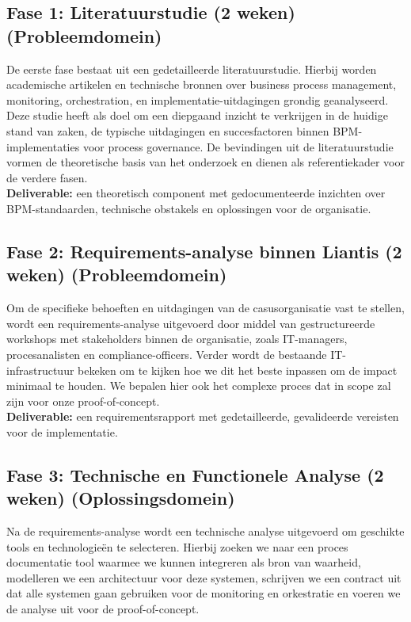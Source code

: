 \subsection{Fase 1: Literatuurstudie (2 weken) (Probleemdomein)}

De eerste fase bestaat uit een gedetailleerde literatuurstudie. Hierbij worden academische artikelen en technische bronnen over business process management, monitoring, orchestration, en implementatie-uitdagingen grondig geanalyseerd. Deze studie heeft als doel om een diepgaand inzicht te verkrijgen in de huidige stand van zaken, de typische uitdagingen en succesfactoren binnen BPM-implementaties voor process governance. De bevindingen uit de literatuurstudie vormen de theoretische basis van het onderzoek en dienen als referentiekader voor de verdere fasen. \\

\textbf{Deliverable:} een theoretisch component met gedocumenteerde inzichten over BPM-standaarden, technische obstakels en oplossingen voor de organisatie.

\subsection{Fase 2: Requirements-analyse binnen Liantis (2 weken) (Probleemdomein)}

Om de specifieke behoeften en uitdagingen van de casusorganisatie vast te stellen, wordt een requirements-analyse uitgevoerd door middel van gestructureerde workshops met stakeholders binnen de organisatie, zoals IT-managers, procesanalisten en compliance-officers. Verder wordt de bestaande IT-infrastructuur bekeken om te kijken hoe we dit het beste inpassen om de impact minimaal te houden. We bepalen hier ook het complexe proces dat in scope zal zijn voor onze proof-of-concept. \\

\textbf{Deliverable:} een requirementsrapport met gedetailleerde, gevalideerde vereisten voor de implementatie.

\subsection{Fase 3: Technische en Functionele Analyse (2 weken) (Oplossingsdomein)}

Na de requirements-analyse wordt een technische analyse uitgevoerd om geschikte tools en technologieën te selecteren. Hierbij zoeken we naar een proces documentatie tool waarmee we kunnen integreren als bron van waarheid, modelleren we een architectuur voor deze systemen, schrijven we een contract uit dat alle systemen gaan gebruiken voor de monitoring en orkestratie en voeren we de analyse uit voor de proof-of-concept.  \\

